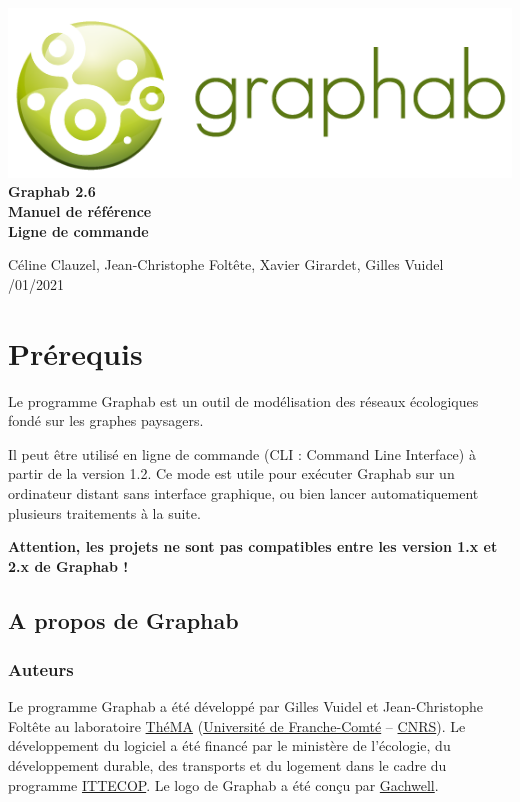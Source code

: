\documentclass[a4paper,10pt]{report}
\begin{document}
 \begin{titlepage}
 	
 	\centering
 	\includegraphics[scale=0.5]{img/logo.png}\\
 	
 	\bigskip
 	\bigskip
 	\bigskip	
 	{\Huge
 		\bfseries
 		Graphab 2.6\\
 		\bigskip
 		Manuel de référence\\
 		Ligne de commande\\
 	}
 	\bigskip
 	\bigskip
 	\bigskip
 	\bigskip
 	\bigskip
 	
 	{\Large		
 		Céline Clauzel, Jean-Christophe Foltête, Xavier Girardet, Gilles Vuidel\\
 		/01/2021\\
 	}
 	
 \end{titlepage}




\tableofcontents

\chapter{Prérequis}

Le programme Graphab est un outil de modélisation des réseaux écologiques fondé sur les graphes paysagers.

Il peut être utilisé en ligne de commande (CLI : Command Line Interface) à partir de la version 1.2. Ce mode est utile pour exécuter Graphab sur un ordinateur distant sans interface graphique, ou bien lancer automatiquement plusieurs traitements à la suite.

\textbf{Attention, les projets ne sont pas compatibles entre les version 1.x et 2.x de Graphab !}

\section{A propos de Graphab}

\subsection{Auteurs}
Le programme Graphab a été développé par Gilles Vuidel et Jean-Christophe Foltête au laboratoire \href{http://thema.univ-fcomte.fr}{ThéMA} (\href{http://www.univ-fcomte.fr}{Université de Franche-Comté} – \href{http://www.cnrs.fr}{CNRS}). Le développement du logiciel a été financé par le ministère de l'écologie, du développement durable, des transports et du logement dans le cadre du programme \href{http://www.ittecop.fr/}{ITTECOP}. Le logo de Graphab a été conçu par \href{http://www.gachwell.com/}{Gachwell}. 
\end{document}
